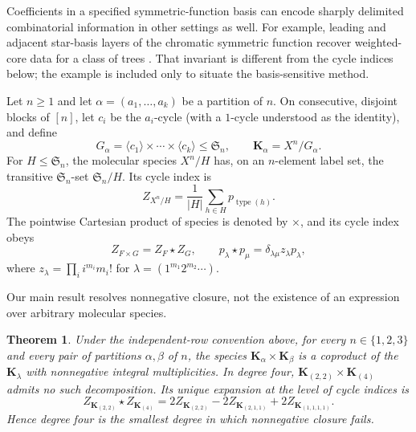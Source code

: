 \documentclass[11pt]{article}
\newtheorem{theorem}{Theorem}
\begin{document}
Coefficients in a specified symmetric-function basis can encode sharply
delimited combinatorial information in other settings as well.  For example,
leading and adjacent star-basis layers of the chromatic symmetric function
recover weighted-core data for a class of trees
\cite{Zeng2026MultiplicityArxiv}.  That invariant is different from the
cycle indices below; the example is included only to situate the
basis-sensitive method.

Let $n\geq1$ and let $\alpha=(a_1,\ldots,a_k)$ be a partition of $n$.  On consecutive,
disjoint blocks of $[n]$, let $c_i$ be the $a_i$-cycle (with a $1$-cycle
understood as the identity), and define
\[
 G_\alpha=\langle c_1\rangle\times\cdots\times\langle c_k\rangle
 \leq \mathfrak{S}_n,
 \qquad
 \mathbf{K}_\alpha=X^n/G_\alpha.
\]
For $H\leq\mathfrak{S}_n$, the molecular species $X^n/H$ has, on an $n$-element
label set, the transitive $\mathfrak{S}_n$-set $\mathfrak{S}_n/H$.  Its cycle index is
\begin{equation}
 Z_{X^n/H}=\frac{1}{|H|}\sum_{h\in H}p_{\operatorname{type}(h)}.
 \label{eq:cycle-index}
\end{equation}
The pointwise Cartesian product of species is denoted by $\times$, and its
cycle index obeys
\begin{equation}
 Z_{F\times G}=Z_F\star Z_G,
 \qquad
 p_\lambda\star p_\mu=\delta_{\lambda\mu}z_\lambda p_\lambda,
 \label{eq:internal-product}
\end{equation}
where $z_\lambda=\prod_i i^{m_i}m_i!$ for
$\lambda=(1^{m_1}2^{m_2}\cdots)$.

Our main result resolves nonnegative closure, not the existence of an
expression over arbitrary molecular species.

\begin{theorem}\label{thm:main}
Under the independent-row convention above, for every $n\in\{1,2,3\}$ and
every pair of partitions $\alpha,\beta$ of $n$, the species
$\mathbf{K}_\alpha\times\mathbf{K}_\beta$ is a coproduct of the $\mathbf{K}_\lambda$ with
nonnegative integral multiplicities.  In degree four,
$\mathbf{K}_{(2,2)}\times\mathbf{K}_{(4)}$ admits no such decomposition.  Its unique
expansion at the level of cycle indices is
\begin{equation}
 Z_{\mathbf{K}_{(2,2)}}\star Z_{\mathbf{K}_{(4)}}
 =2Z_{\mathbf{K}_{(2,2)}}-2Z_{\mathbf{K}_{(2,1,1)}}
   +2Z_{\mathbf{K}_{(1,1,1,1)}}.
 \label{eq:signed-expansion}
\end{equation}
Hence degree four is the smallest degree in which nonnegative closure fails.
\end{theorem}
\end{document}
